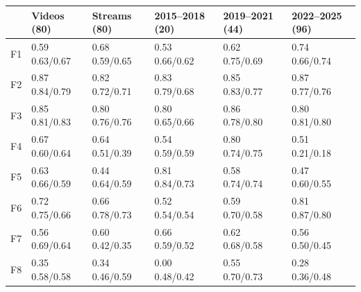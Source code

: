 {\footnotesize\setlength{\tabcolsep}{3.2pt}
\begin{tabular}{@{}l l l l l l @{}}
\toprule
 & Videos (80) & Streams (80) & 2015--2018 (20) & 2019--2021 (44) & 2022--2025 (96) \\
\midrule
F1 & 0.59 {\scriptsize 0.63/0.67} & 0.68 {\scriptsize 0.59/0.65} & 0.53 {\scriptsize 0.66/0.62} & 0.62 {\scriptsize 0.75/0.69} & 0.74 {\scriptsize 0.66/0.74} \\
F2 & 0.87 {\scriptsize 0.84/0.79} & 0.82 {\scriptsize 0.72/0.71} & 0.83 {\scriptsize 0.79/0.68} & 0.85 {\scriptsize 0.83/0.77} & 0.87 {\scriptsize 0.77/0.76} \\
F3 & 0.85 {\scriptsize 0.81/0.83} & 0.80 {\scriptsize 0.76/0.76} & 0.80 {\scriptsize 0.65/0.66} & 0.86 {\scriptsize 0.78/0.80} & 0.80 {\scriptsize 0.81/0.80} \\
F4 & 0.67 {\scriptsize 0.60/0.64} & 0.64 {\scriptsize 0.51/0.39} & 0.54 {\scriptsize 0.59/0.59} & 0.80 {\scriptsize 0.74/0.75} & 0.51 {\scriptsize 0.21/0.18} \\
F5 & 0.63 {\scriptsize 0.66/0.59} & 0.44 {\scriptsize 0.64/0.59} & 0.81 {\scriptsize 0.84/0.73} & 0.58 {\scriptsize 0.74/0.74} & 0.47 {\scriptsize 0.60/0.55} \\
F6 & 0.72 {\scriptsize 0.75/0.66} & 0.66 {\scriptsize 0.78/0.73} & 0.52 {\scriptsize 0.54/0.54} & 0.59 {\scriptsize 0.70/0.58} & 0.81 {\scriptsize 0.87/0.80} \\
F7 & 0.56 {\scriptsize 0.69/0.64} & 0.60 {\scriptsize 0.42/0.35} & 0.66 {\scriptsize 0.59/0.52} & 0.62 {\scriptsize 0.68/0.58} & 0.56 {\scriptsize 0.50/0.45} \\
F8 & 0.35 {\scriptsize 0.58/0.58} & 0.34 {\scriptsize 0.46/0.59} & 0.00 {\scriptsize 0.48/0.42} & 0.55 {\scriptsize 0.70/0.73} & 0.28 {\scriptsize 0.36/0.48} \\
\bottomrule
\end{tabular}}
